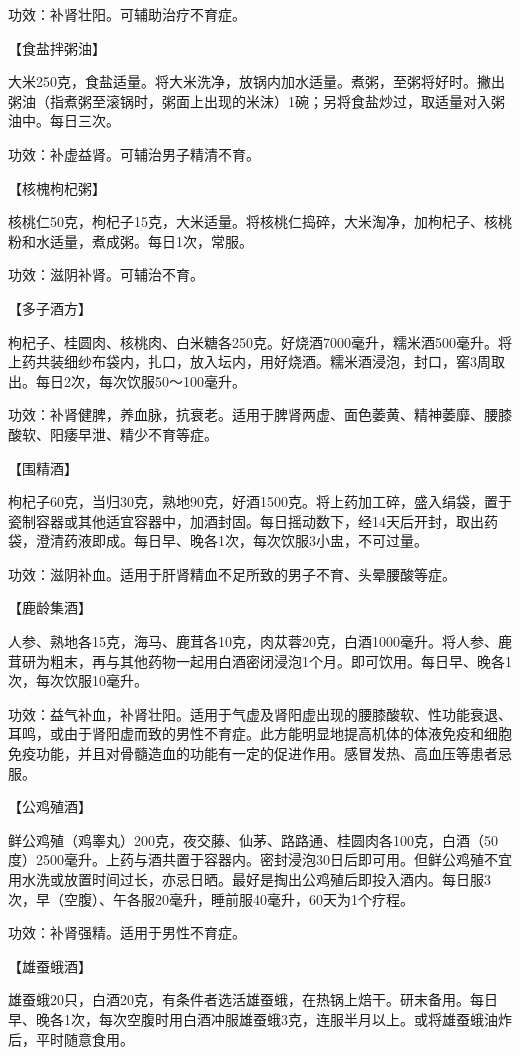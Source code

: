 \documentclass[12pt,UTF8]{ctexbook}
\begin{document}
功效：补肾壮阳。可辅助治疗不育症。

【食盐拌粥油】

大米250克，食盐适量。将大米洗净，放锅内加水适量。煮粥，至粥将好时。撇出粥油（指煮粥至滚锅时，粥面上出现的米沫）1碗；另将食盐炒过，取适量对入粥油中。每日三次。

功效：补虚益肾。可辅治男子精清不育。

【核槐枸杞粥】

核桃仁50克，枸杞子15克，大米适量。将核桃仁捣碎，大米淘净，加枸杞子、核桃粉和水适量，煮成粥。每日1次，常服。

功效：滋阴补肾。可辅治不育。

【多子酒方】

枸杞子、桂圆肉、核桃肉、白米糖各250克。好烧酒7000毫升，糯米酒500毫升。将上药共装细纱布袋内，扎口，放入坛内，用好烧酒。糯米酒浸泡，封口，窖3周取出。每日2次，每次饮服50～100毫升。

功效：补肾健脾，养血脉，抗衰老。适用于脾肾两虚、面色萎黄、精神萎靡、腰膝酸软、阳痿早泄、精少不育等症。

【围精酒】

枸杞子60克，当归30克，熟地90克，好酒1500克。将上药加工碎，盛入绢袋，置于瓷制容器或其他适宜容器中，加酒封固。每日摇动数下，经14天后开封，取出药袋，澄清药液即成。每日早、晚各1次，每次饮服3小盅，不可过量。

功效：滋阴补血。适用于肝肾精血不足所致的男子不育、头晕腰酸等症。

【鹿龄集酒】

人参、熟地各15克，海马、鹿茸各10克，肉苁蓉20克，白酒1000毫升。将人参、鹿茸研为粗末，再与其他药物一起用白酒密闭浸泡1个月。即可饮用。每日早、晚各1次，每次饮服10毫升。

功效：益气补血，补肾壮阳。适用于气虚及肾阳虚出现的腰膝酸软、性功能衰退、耳鸣，或由于肾阳虚而致的男性不育症。此方能明显地提高机体的体液免疫和细胞免疫功能，并且对骨髓造血的功能有一定的促进作用。感冒发热、高血压等患者忌服。

【公鸡殖酒】

鲜公鸡殖（鸡睾丸）200克，夜交藤、仙茅、路路通、桂圆肉各100克，白酒（50度）2500毫升。上药与酒共置于容器内。密封浸泡30日后即可用。但鲜公鸡殖不宜用水洗或放置时间过长，亦忌日晒。最好是掏出公鸡殖后即投入酒内。每日服3次，早（空腹）、午各服20毫升，睡前服40毫升，60天为1个疗程。

功效：补肾强精。适用于男性不育症。

【雄蚕蛾酒】

雄蚕蛾20只，白酒20克，有条件者选活雄蚕蛾，在热锅上焙干。研末备用。每日早、晚各1次，每次空腹时用白酒冲服雄蚕蛾3克，连服半月以上。或将雄蚕蛾油炸后，平时随意食用。
\end{document}
